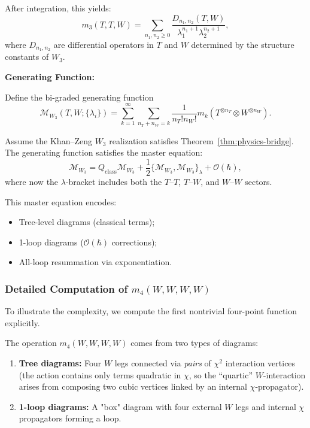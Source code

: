 After integration, this yields:
\begin{equation}
m_3(T,T,W) = \sum_{n_1, n_2 \geq 0} \frac{D_{n_1,n_2}(T,W)}{\lambda_1^{n_1+1} \lambda_2^{n_2+1}},
\end{equation}
where $D_{n_1,n_2}$ are differential operators in $T$ and $W$ determined by the structure constants of $W_3$.

\textbf{Generating Function:}

Define the bi-graded generating function
\begin{equation}
\mathcal{M}_{W_3}(T,W; \{\lambda_i\}) = \sum_{k=1}^\infty \sum_{n_T + n_W = k} \frac{1}{n_T! n_W!} m_k(T^{\otimes n_T} \otimes W^{\otimes n_W}).
\end{equation}

\begin{theorem}
Assume the Khan--Zeng $W_3$ realization satisfies
Theorem~\ref{thm:physics-bridge}.
The generating function satisfies the master equation:
\begin{equation}
\mathcal{M}_{W_3} = Q_{\text{class}} \mathcal{M}_{W_3} + \frac{1}{2} \{\mathcal{M}_{W_3}, \mathcal{M}_{W_3}\}_{\lambda} + \mathcal{O}(\hbar),
\end{equation}
where now the $\lambda$-bracket includes both the $T$--$T$, $T$--$W$, and $W$--$W$ sectors.
\end{theorem}

This master equation encodes:
\begin{itemize}
\item Tree-level diagrams (classical terms);
\item 1-loop diagrams ($\mathcal{O}(\hbar)$ corrections);
\item All-loop resummation via exponentiation.
\end{itemize}

\subsubsection{Detailed Computation of $m_4(W,W,W,W)$}

To illustrate the complexity, we compute the first nontrivial four-point function explicitly.

\begin{construction}
The operation $m_4(W,W,W,W)$ comes from two types of diagrams:
\begin{enumerate}
\item \textbf{Tree diagrams:} Four $W$ legs connected via \emph{pairs} of $\chi^2$ interaction vertices (the action contains only terms quadratic in $\chi$, so the ``quartic'' $W$-interaction arises from composing two cubic vertices linked by an internal $\chi$-propagator).
\item \textbf{1-loop diagrams:} A "box" diagram with four external $W$ legs and internal $\chi$ propagators forming a loop.
\end{enumerate}
\end{construction}

